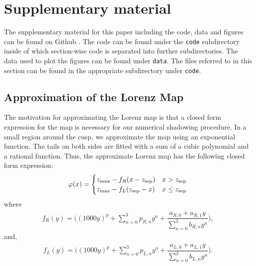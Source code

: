 

\section{Supplementary material}
The supplementary material for this paper including the code, data and figures can be found on Github \cite{supp}. The code can be found under the \verb+code+ subdirectory inside of which section-wise code is separated into further subdirectories. The data used to plot the figures can be found under \verb+data+. The files referred to in this section can be found in the appropriate subdirectory under \verb+code+. 
\subsection{Approximation of the Lorenz Map}
\label{sec:lorenzMapApprox}
The motivation for approximating the Lorenz map is that a 
closed form expression for the map is necessary for our numerical shadowing procedure. In a small region around the cusp, we approximate the map using an exponential function. The tails on both sides are fitted with a sum of a cubic polynomial and a rational function. Thus, the approximate Lorenz map has the 
following closed form expression:
\begin{align}
    \varphi(x) = \begin{cases}
        z_{\rm max} - f_R(x - z_{\rm sep})   &  x > z_{\rm sep} \\
        z_{\rm max} -  f_L(z_{\rm sep} - x)   &  x \leq z_{\rm sep}
    \end{cases}
\end{align}
where 
\begin{align}
    f_R(y) = \Big( (1000 y)^p + 
        \sum_{n=0}^3 p_{R,n} y^n + \dfrac{a_{R,0} + a_{R,1} y}{\sum_{n=0}^3 b_{R,n} y^n}\Big),
\end{align}
and,
\begin{align}
    f_L(y) = \Big((1000 y)^p 
        + \sum_{n=0}^3 p_{L,n} y^n + \dfrac{a_{L,0} + a_{L,1}y}{\sum_{n=0}^3 b_{L,n} y^n}\Big).
\end{align}
